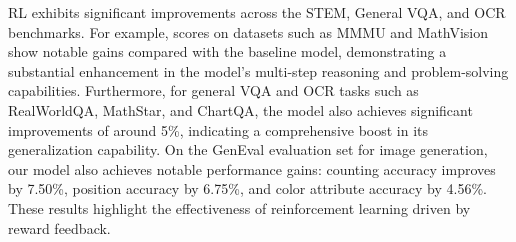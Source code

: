 
    

RL exhibits significant improvements across the STEM, General VQA, and OCR benchmarks. For example, scores on datasets such as MMMU and MathVision show notable gains compared with the baseline model, demonstrating a substantial enhancement in the model's multi-step reasoning and problem-solving capabilities. Furthermore, for general VQA and OCR tasks such as RealWorldQA, MathStar, and ChartQA, the model also achieves significant improvements of around 5\%, indicating a comprehensive boost in its generalization capability. On the GenEval evaluation set for image generation, our model also achieves notable performance gains: counting accuracy improves by 7.50\%, position accuracy by 6.75\%, and color attribute accuracy by 4.56\%. These results highlight the effectiveness of reinforcement learning driven by reward feedback.

